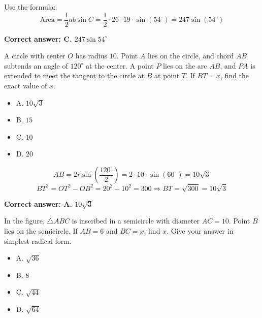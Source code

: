 \documentclass[12pt]{article}
\begin{document}
\begin{tcolorbox}[colback=green!10, colframe=green!50!black, title=Answer]
Use the formula:
\[
\text{Area} = \frac{1}{2} ab \sin C = \frac{1}{2} \cdot 26 \cdot 19 \cdot \sin(54^\circ) = 247 \sin(54^\circ)
\]

\textbf{Correct answer: C. $247 \sin 54^\circ$}
\end{tcolorbox}

\begin{tcolorbox}[colback=blue!5!white, colframe=blue!75!black, title=Question]
A circle with center $O$ has radius $10$. Point $A$ lies on the circle, and chord $AB$ subtends an angle of $120^\circ$ at the center. A point $P$ lies on the arc $AB$, and $PA$ is extended to meet the tangent to the circle at $B$ at point $T$. If $BT = x$, find the exact value of $x$.

\begin{itemize}
    \item A. $10\sqrt{3}$
    \item B. $15$
    \item C. $10$
    \item D. $20$
\end{itemize}
\end{tcolorbox}

\begin{tcolorbox}[colback=green!10, colframe=green!50!black, title=Answer]
\[
AB = 2r \sin\left(\frac{120^\circ}{2}\right) = 2 \cdot 10 \cdot \sin(60^\circ) = 10\sqrt{3}
\]
\[
BT^2 = OT^2 - OB^2 = 20^2 - 10^2 = 300 \Rightarrow BT = \sqrt{300} = 10\sqrt{3}
\]

\textbf{Correct answer: A. $10\sqrt{3}$}
\end{tcolorbox}

\begin{tcolorbox}[colback=blue!5!white, colframe=blue!75!black, title=Question]
In the figure, $\triangle ABC$ is inscribed in a semicircle with diameter $AC = 10$. Point $B$ lies on the semicircle. If $AB = 6$ and $BC = x$, find $x$. Give your answer in simplest radical form.

\begin{itemize}
    \item A. $\sqrt{36}$
    \item B. $8$
    \item C. $\sqrt{44}$
    \item D. $\sqrt{64}$
\end{itemize}
\end{tcolorbox}
\end{document}
